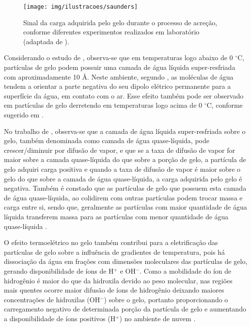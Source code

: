 
\begin{figure}[htp]
\centering 
\texttt{[image: img/ilustracoes/saunders]}
\caption{Sinal da carga adquirida pelo gelo durante o processo de acreção, conforme diferentes experimentos realizados em laboratório (adaptada de ).}
\label{fig:saunders}
\end{figure}

Considerando o estudo de , observa-se que em temperaturas logo abaixo de 0 $^{\circ}$C, partículas de gelo podem possuir uma camada de água líquida super-resfriada com aproximadamente 10 {\AA}. Neste ambiente, segundo , as moléculas de água tendem a orientar a parte negativa do seu dipolo elétrico permanente para a superfície da água, em contato com o ar. Esse efeito também pode ser observado em partículas de gelo derretendo em temperaturas logo acima de 0 $^{\circ}$C, conforme sugerido em \cite{fletcher}.

No trabalho de , observa-se que a camada de água líquida super-resfriada sobre o gelo, também denominada como camada de água quase-líquida, pode crescer/diminuir por difusão de vapor, e que se a taxa de difusão de vapor for maior sobre a camada quase-líquida do que sobre a porção de gelo, a partícula de gelo adquiri carga positiva e quando a taxa de difusão de vapor é maior sobre o gelo do que sobre a camada de água quase-líquida, a carga adquirida pelo gelo é negativa. Também é constado que as partículas de gelo que possuem esta camada de água quase-líquida, ao colidirem com outras partículas podem trocar massa e carga entre si, sendo que, geralmente as partículas com maior quantidade de água líquida transferem massa para as partículas com menor quantidade de água quase-líquida \cite{baker1994}. 


O efeito termoelétrico no gelo também contribui para a eletrificação das partículas de gelo sobre a influência de gradientes de temperatura, pois há dissociação da água em frações com dimensões moleculares das partículas de gelo, gerando disponibilidade de íons de H$^{+}$ e OH$^{-}$. Como a mobilidade do íon de hidrogênio é maior do que da hidroxila devido ao peso molecular, nas regiões mais quentes ocorre maior difusão de íons de hidrogênio deixando maiores concentrações de hidroxilas (OH$^{-}$) sobre o gelo, portanto proporcionando o carregamento negativo de determinada porção da partícula de gelo e aumentando a disponibilidade de íons positivos (H$^{+}$) no ambiente de nuvem \cite{latham1961}.  

